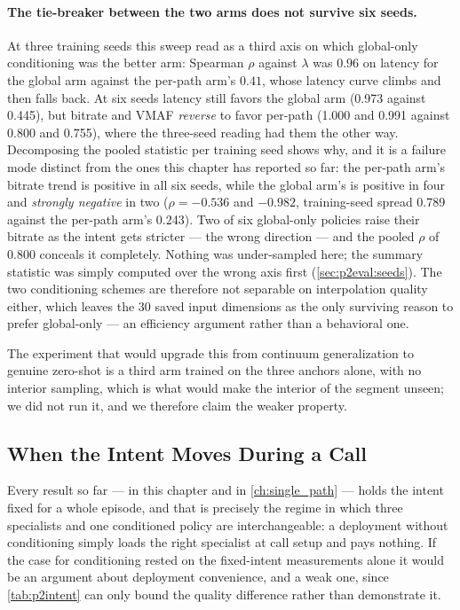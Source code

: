 \paragraph{The tie-breaker between the two arms does not survive six seeds.} At three training seeds
this sweep read as a third axis on which global-only conditioning was the better arm: Spearman $\rho$
against $\lambda$ was $0.96$ on latency for the global arm against the per-path arm's $0.41$, whose
latency curve climbs and then falls back. At six seeds latency still favors the global arm (0.973
against 0.445), but bitrate and VMAF \emph{reverse} to favor per-path (1.000 and 0.991 against 0.800 and
0.755), where the three-seed reading had them the other way. Decomposing the pooled statistic per
training seed shows why, and it is a failure mode distinct from the ones this chapter has reported so
far: the per-path arm's bitrate trend is positive in all six seeds, while the global arm's is positive
in four and \emph{strongly negative} in two ($\rho = -0.536$ and $-0.982$, training-seed spread 0.789
against the per-path arm's 0.243). Two of six global-only policies raise their bitrate as the intent
gets stricter --- the wrong direction --- and the pooled $\rho$ of 0.800 conceals it completely. Nothing
was under-sampled here; the summary statistic was simply computed over the wrong axis first
(\cref{sec:p2eval:seeds}). The two conditioning schemes are therefore not separable on interpolation quality either, which leaves the 30 saved input dimensions as the only surviving reason
to prefer global-only --- an efficiency argument rather than a behavioral one.

The experiment that would upgrade this from continuum generalization to genuine zero-shot is a third
arm trained on the three anchors alone, with no interior sampling, which is what would make the
interior of the segment unseen; we did not run it, and we therefore claim the weaker property.

\subsection{When the Intent Moves During a Call}
\label{sec:p2eval:switch}

Every result so far --- in this chapter and in \cref{ch:single_path} --- holds the intent fixed for a
whole episode, and that is precisely the regime in which three specialists and one conditioned policy
are interchangeable: a deployment without conditioning simply loads the right specialist at call setup
and pays nothing. If the case for conditioning rested on the fixed-intent measurements alone it would be
an argument about deployment convenience, and a weak one, since \cref{tab:p2intent} can only bound the
quality difference rather than demonstrate it.

